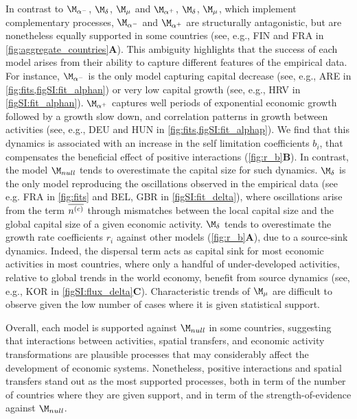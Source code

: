 In contrast to $\modalphan$, $\moddelta$, $\modmu$ and $\modalphap$, $\moddelta$, $\modmu$, which implement complementary processes, $\modalphan$ and $\modalphap$ are structurally antagonistic, but are nonetheless equally supported in some countries (see, e.g., FIN and FRA in \cref{fig:aggregate_countries}\textbf{A}). This ambiguity highlights that the success of each model arises from their ability to capture different features of the empirical data.
% 
For instance, $\modalphan$ is the only model capturing capital decrease (see, e.g., ARE in \cref{fig:fits,figSI:fit_alphan}) or very low capital growth (see, e.g., HRV in \cref{figSI:fit_alphan}).
% 
$\modalphap$  captures well periods of exponential economic growth followed by a growth slow down, and correlation patterns in growth between activities (see, e.g., DEU and HUN in \cref{fig:fits,figSI:fit_alphap}). We find that this dynamics is associated with an increase in the self limitation coefficients $b_i$, that compensates the beneficial effect of positive interactions (\cref{fig:r_b}\textbf{B}). In contrast, the model $\modnull$ tends to overestimate the capital size for such dynamics.
%
$\moddelta$ is the only model reproducing the oscillations observed in the empirical data (see e.g. FRA in \cref{fig:fits} and BEL, GBR in \cref{figSI:fit_delta}), where oscillations arise from the term $\overline{n^{(c)}}$ through mismatches between the local capital size and the global capital size of a given economic activity. $\moddelta$ tends to overestimate the growth rate coefficients $r_i$ against other models (\cref{fig:r_b}\textbf{A}), due to a source-sink dynamics. Indeed, the dispersal term acts as capital sink for most economic activities in most countries, where only a handful of under-developed activities, relative to global trends in the world economy, benefit from source dynamics (see, e.g., KOR in \cref{figSI:flux_delta}\textbf{C}).
% 
Characteristic trends of $\modmu$ are difficult to observe given the low number of cases where it is given statistical support. 

Overall, each model is supported against $\modnull$ in some countries, suggesting that interactions between activities, spatial transfers, and economic activity transformations are plausible processes that may considerably affect the development of economic systems. Nonetheless, positive interactions and spatial transfers stand out as the most supported processes, both in term of the number of countries where they are given support, and in term of the strength-of-evidence against $\modnull$.

